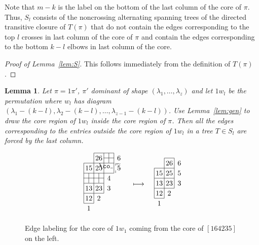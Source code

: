 \documentclass[10pt]{amsart}
\newtheorem{lemm}[theo]{Lemma}
\theoremstyle{definition}
\numberwithin{equation}{section}
\newcommand{\lmp}[1]{\mathrel{\mathop{\longmapsto}^{#1}}}
\newcommand*\+{\smash{\lower2pt\hbox{\rlap{\vrule height14pt}}\raise2pt\hbox{\rlap{\hskip-3pt \vrule height.4pt depth0pt width14.7pt}}}}
\newcommand*\textcross{\ \smash{\lower4pt\hbox{\rlap{\hskip4.15pt\vrule height14pt}}\raise2.8pt\hbox{\rlap{\hskip-3pt \vrule height.4pt depth0pt width14.7pt}}}\hskip12.7pt}
\newcommand*\textelbow{\ \hskip.1pt\smash{\raise2.8pt\hbox{\co \hskip 4.15pt\rlap{\rlap{\char'005} \char'007}\lower6.8pt\rlap{\vrule height3.5pt}\raise3.6pt\rlap{\vrule height3.5pt}}\raise2.8pt\hbox{\rlap{\hskip-7.15pt \vrule height.4pt depth0pt width3.5pt}\rlap{\hskip4.05pt \vrule height.4pt depth0pt width3.5pt}}}\hskip8.7pt}
\begin{document}
Note that $m-k$ is the label on the bottom of the last column of the core of $\pi$. Thus, $S_l$ consists of the noncrossing alternating spanning trees of the directed transitive closure of $T(\pi)$ that do not contain the edges corresponding to the top $l$ crosses in last column of the core of $\pi$ and contain the edges corresponding to the bottom $k-l$ elbows in last column of the core.

\begin{proof}[Proof of Lemma~\ref{lem:S}]
This follows immediately from the definition of $T(\pi)$.
\end{proof}

\begin{lemm}\label{lem:fixing}
Let $\pi=1\pi'$, $\pi'$ dominant of shape $(\lambda_1, \dots, \lambda_z)$ and let $1w_l$ be the permutation where $w_l$ has diagram $(\lambda_1-(k-l), \lambda_2-(k-l), \dots, \lambda_{z-1}-(k-l))$. Use Lemma~\ref{lem:gen} to draw the core region of $1w_l$ inside the core region of $\pi$. Then all the edges corresponding to the entries outside the core region of $1w_l$ in a tree $T\in S_l$ are forced by the last column.
\end{lemm}


\begin{figure}[h]
\[
\begin{aligned}
\begin{tikzpicture}
\draw (0,1.5)--(1.5,1.5)--(1.5,2.5)--(0.5,2.5)--(0.5,0)--(0,0)--(0,2)--(1.5,2);
\draw (0,0.5)--(1,0.5)--(1,2.5);
\draw (0,1)--(1,1);
\draw (0.26,1.15) node {$\textcross$};
\draw (0.76,1.15) node {$\textcross$};
\draw (1.26,1.65) node {$\textelbow$};
\draw (1.26,2.15) node {$\textcross$};
\draw (0.25,.25) node {12};
\draw (0.25,.75) node {13};
\draw (0.75,.75) node {23};
\draw (0.25,1.75) node {15};
\draw (0.75,1.75) node {25};
\draw (0.75,2.25) node {26};
\draw (0.25,-.25) node {1};
\draw (0.75,.25) node {2};
\draw (1.25,.75) node {3};
\draw (1.25,1.25) node {4};
\draw (1.75,1.75) node {5};
\draw (1.75,2.25) node {6};
\end{tikzpicture}
\end{aligned}
\quad\lmp{}\quad
\begin{aligned}
\begin{tikzpicture}
\draw (0,0)--(.5,0)--(0.5,2)--(1,2)--(1,1)--(0,1)--(0,0);
\draw (0,1)--(0,1.5)--(1,1.5);
\draw (0,.5)--(1,.5)--(1,1);
\draw (0.25,-.25) node {1};
\draw (0.75,.25) node {2};
\draw (1.25,.75) node {3};
\draw (1.25,1.25) node {5};
\draw (1.25,1.75) node {6};
\draw (0.25,.25) node {12};
\draw (0.25,.75) node {13};
\draw (0.75,.75) node {23};
\draw (0.25,1.25) node {15};
\draw (0.75,1.25) node {25};
\draw (0.75,1.75) node {26};
\end{tikzpicture}
\end{aligned}
\]
\caption{Edge labeling for the core of $1w_1$ coming from the core of $[164235]$ on the left.} \label{fig:labelling}%
\end{figure}
\end{document}
